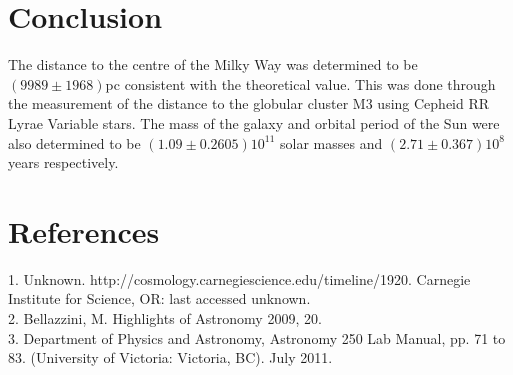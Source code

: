 \documentclass{article}
\begin{document}
\section{Conclusion}
The distance to the centre of the Milky Way was determined to be $(9989\pm1968)$pc consistent with the theoretical value. This was done through the measurement of the distance to the globular cluster M3 using Cepheid RR Lyrae Variable stars. The mass of the galaxy and orbital period of the Sun were also determined to be  $(1.09\pm0.2605)10^{11}$ solar masses and $(2.71\pm0.367)10^8$ years respectively.
\section{References}
1. Unknown. http://cosmology.carnegiescience.edu/timeline/1920. Carnegie Institute for Science, OR: last accessed unknown.\\
2. Bellazzini, M. Highlights of Astronomy 2009, 20.\\
3. Department of Physics and Astronomy, Astronomy 250 Lab Manual, pp. 71 to 83. (University of Victoria: Victoria, BC). July 2011.
\end{document}
